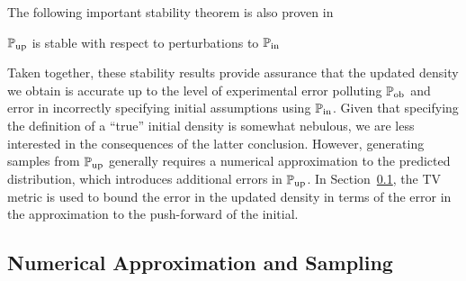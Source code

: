 The following important stability theorem is also proven in \cite{BJW18}

\begin{thm}
  $\operatorname*{\mathbb{P}_{up}}$ is stable with respect to perturbations to $\operatorname*{\mathbb{P}_{in}}$
  \label{thm:stableinitial}
\end{thm}

Taken together, these stability results provide assurance that the updated density we obtain is accurate up to the level of experimental error polluting $\operatorname*{\mathbb{P}_{ob}}$ and error in incorrectly specifying initial assumptions using $\operatorname*{\mathbb{P}_{in}}$.
Given that specifying the definition of a ``true'' initial density is somewhat nebulous, we are less interested in the consequences of the latter conclusion.
However, generating samples from $\operatorname*{\mathbb{P}_{up}}$ generally requires a numerical approximation to the predicted distribution, which introduces additional errors in $\operatorname*{\mathbb{P}_{up}}$.
In Section~\ref{sec:approx}, the TV metric is used to bound the error in the updated density in terms of the error in the approximation to the push-forward of the initial.




\subsection{Numerical Approximation and Sampling}\label{sec:approx}
%
%
%
%



